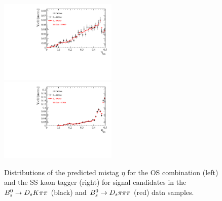% 

\begin{figure}[h]
\includegraphics[height=!,width=0.5\textwidth]{figs/dataVsMC/norm2signal/Ds2all_OS_Combination_PROB.pdf}
\includegraphics[height=!,width=0.5\textwidth]{figs/dataVsMC/norm2signal/Ds2all_SS_Kaon_PROB.pdf}
\caption{Distributions of the predicted mistag $\eta$ for the OS combination (left) and the SS kaon tagger (right) 
for signal candidates in the ${{B}^0_{s}}\rightarrow{\ensuremath{{D}_{s}}}{\ensuremath{K}}{\ensuremath{\pi}}{\ensuremath{\pi}}$ (black) and ${{B}^0_{s}}\rightarrow{\ensuremath{{D}_{s}}}{\ensuremath{\pi}}{\ensuremath{\pi}}{\ensuremath{\pi}}$ (red) data samples.}
\label{fig:w_data_comparison}
\end{figure}

